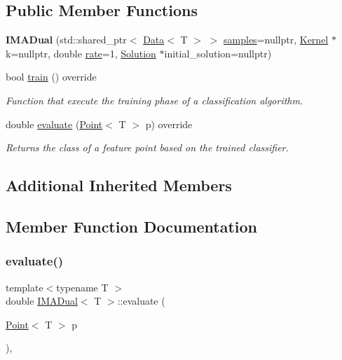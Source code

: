 \subsection*{Public Member Functions}
\begin{DoxyCompactItemize}
\item 
\mbox{\label{class_i_m_a_dual_a22a5cf72fe88fd8bb846cf1b5758d61c}} 
{\bfseries I\+M\+A\+Dual} (std\+::shared\+\_\+ptr$<$ \hyperlink{class_data}{Data}$<$ T $>$ $>$ \hyperlink{class_classifier_a0000b47a2e0784ada4c52d7046c4adb8}{samples}=nullptr, \hyperlink{class_kernel}{Kernel} $\ast$k=nullptr, double \hyperlink{class_classifier_a7b1c4ef87631bd9e46682e5bc4315111}{rate}=1, \hyperlink{class_solution}{Solution} $\ast$initial\+\_\+solution=nullptr)
\item 
bool \hyperlink{class_i_m_a_dual_aff820af6454ceeef4d23af48476d7218}{train} () override
\begin{DoxyCompactList}\small\item\em Function that execute the training phase of a classification algorithm. \end{DoxyCompactList}\item 
double \hyperlink{class_i_m_a_dual_af67dfc75554d055cfdf761ee940243d7}{evaluate} (\hyperlink{class_point}{Point}$<$ T $>$ p) override
\begin{DoxyCompactList}\small\item\em Returns the class of a feature point based on the trained classifier. \end{DoxyCompactList}\end{DoxyCompactItemize}
\subsection*{Additional Inherited Members}


\subsection{Member Function Documentation}
\mbox{\label{class_i_m_a_dual_af67dfc75554d055cfdf761ee940243d7}} 
\subsubsection{\texorpdfstring{evaluate()}{evaluate()}}
{\footnotesize\ttfamily template$<$typename T $>$ \\
double \hyperlink{class_i_m_a_dual}{I\+M\+A\+Dual}$<$ T $>$\+::evaluate (\begin{DoxyParamCaption}\item[{\hyperlink{class_point}{Point}$<$ T $>$}]{p }\end{DoxyParamCaption})\hspace{0.3cm}{\ttfamily [override]}, {\ttfamily [virtual]}}



